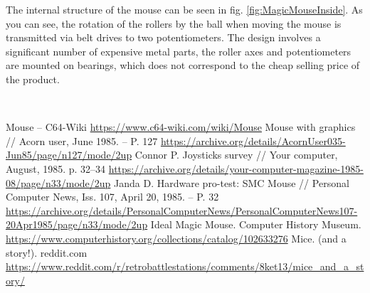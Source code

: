 \documentclass[11pt, a4paper]{article}
\begin{document}
The internal structure of the mouse can be seen in fig. \ref{fig:MagicMouseInside}. As you can see, the rotation of the rollers by the ball when moving the mouse is transmitted via belt drives to two potentiometers. The design involves a significant number of expensive metal parts, the roller axes and potentiometers are mounted on bearings, which does not correspond to the cheap selling price of the product.

~

\begin{thebibliography}{9}
 Mouse -- C64-Wiki \url{https://www.c64-wiki.com/wiki/Mouse}
 Mouse with graphics // Acorn user, June 1985. -- P. 127 \url{https://archive.org/details/AcornUser035-Jun85/page/n127/mode/2up}
 Connor P. Joysticks survey // Your computer, August, 1985. p. 32--34 \url{https://archive.org/details/your-computer-magazine-1985-08/page/n33/mode/2up}
 Janda D. Hardware pro-test: SMC Mouse // Personal Computer News, Iss. 107, April 20, 1985. -- P. 32 \url{https://archive.org/details/PersonalComputerNews/PersonalComputerNews107-20Apr1985/page/n33/mode/2up}
 Ideal Magic Mouse. Computer History Museum. \url{https://www.computerhistory.org/collections/catalog/102633276}
 Mice. (and a story!). reddit.com
 \url{https://www.reddit.com/r/retrobattlestations/comments/8ket13/mice_and_a_story/}
\end{thebibliography}
\end{document}
